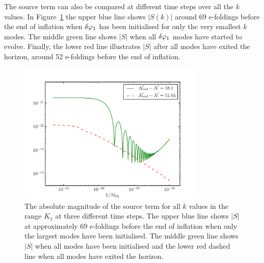 The source term can also be compared at different time steps over all the $k$ values.
In Figure~\ref{fig:src-3ns} the upper blue line shows $|S(k)|$ around 69 e-foldings
before the end of
inflation when $\delta\varphi_{1}$ has been initialised for only the very smallest $k$
modes. The middle green
line shows $|S|$ when all $\delta\varphi_{1}$ modes have started to evolve. Finally, the lower
red line illustrates $|S|$
after all modes have exited the horizon, around 52 e-foldings before the end of
inflation.
% 
\begin{figure}[htbp]
\centering
\includegraphics[width=0.8\textwidth]{numerical/graphs/src_3ns-large}
\caption[Source Term at Three Different Times]{The absolute magnitude of the source 
term for all $k$ values in the range $K_1$ at three different time steps. The upper
blue line shows $|S|$ at approximately $69$ e-foldings before the end of inflation
when
only the largest modes have been initialised. The middle green line shows $|S|$ when
all modes
have been initialised and the lower red dashed line when all modes have
exited the horizon.}
\label{fig:src-3ns}
\end{figure}
% 





